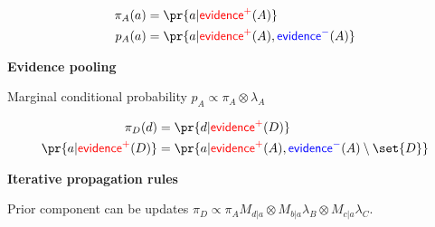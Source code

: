 \documentclass[landscape,footrule]{foils}
\newcommand{\EVPOS}{\textcolor{red}{\mathsf{evidence}^+}}
\newcommand{\EVNEG}{\textcolor{blue}{\mathsf{evidence}^-}}
\begin{document}
\vspace*{-2.5cm}

\begin{align*}
\pi_A(a)&=\pr{a|\EVPOS(A)}\\
p_A(a)&=\pr{a|\EVPOS(A),\EVNEG(A)}
\end{align*}\vspace*{-4ex}


\textbf{Evidence pooling}
\begin{triangles}
\item Marginal conditional probability $p_A\propto \pi_A\otimes\lambda_A$\vspace*{-1ex}
\end{triangles}



\vspace*{-3.0cm}

\begin{align*}
\pi_D(d)&=\pr{d|\EVPOS(D)}\\
\pr{a|\EVPOS(D)}&=\pr{a|\EVPOS(A),\EVNEG(A)\setminus\set{D}}
\end{align*}\vspace*{-4ex}


\textbf{Iterative propagation rules}
\begin{triangles}
\item Prior component can be updates $\pi_D\propto \pi_AM_{d|a} \otimes M_{b|a}\lambda_B\otimes M_{c|a}\lambda_C$\enspace.
\end{triangles}
\end{document}
